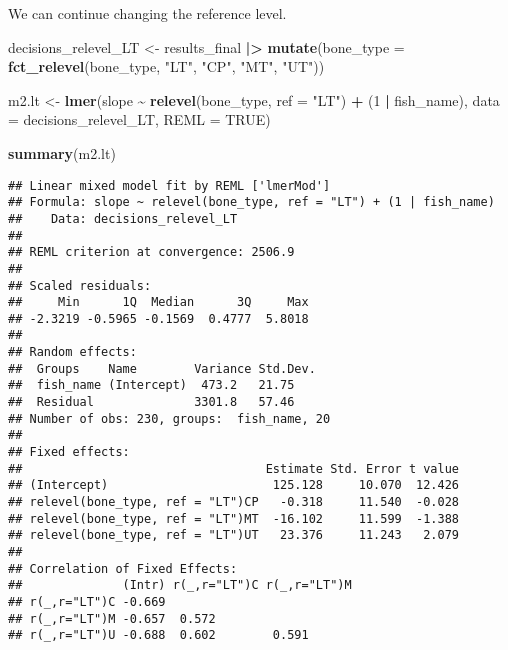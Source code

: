 \documentclass[
]{article}
\newenvironment{Shaded}{\begin{snugshade}}{\end{snugshade}}
\newcommand{\AttributeTok}[1]{\textcolor[rgb]{0.13,0.29,0.53}{#1}}
\newcommand{\ConstantTok}[1]{\textcolor[rgb]{0.56,0.35,0.01}{#1}}
\newcommand{\DecValTok}[1]{\textcolor[rgb]{0.00,0.00,0.81}{#1}}
\newcommand{\FunctionTok}[1]{\textcolor[rgb]{0.13,0.29,0.53}{\textbf{#1}}}
\newcommand{\NormalTok}[1]{#1}
\newcommand{\OtherTok}[1]{\textcolor[rgb]{0.56,0.35,0.01}{#1}}
\newcommand{\SpecialCharTok}[1]{\textcolor[rgb]{0.81,0.36,0.00}{\textbf{#1}}}
\newcommand{\StringTok}[1]{\textcolor[rgb]{0.31,0.60,0.02}{#1}}
\begin{document}
We can continue changing the reference level.

\begin{Shaded}
\begin{Highlighting}[]
\NormalTok{decisions\_relevel\_LT }\OtherTok{\textless{}{-}}\NormalTok{ results\_final }\SpecialCharTok{|\textgreater{}}
   \FunctionTok{mutate}\NormalTok{(}\AttributeTok{bone\_type =} \FunctionTok{fct\_relevel}\NormalTok{(bone\_type, }\StringTok{"LT"}\NormalTok{, }\StringTok{"CP"}\NormalTok{, }\StringTok{"MT"}\NormalTok{, }\StringTok{"UT"}\NormalTok{))}

\NormalTok{m2.lt }\OtherTok{\textless{}{-}} \FunctionTok{lmer}\NormalTok{(slope }\SpecialCharTok{\textasciitilde{}}  \FunctionTok{relevel}\NormalTok{(bone\_type, }\AttributeTok{ref =} \StringTok{"LT"}\NormalTok{) }\SpecialCharTok{+}\NormalTok{ (}\DecValTok{1} \SpecialCharTok{|}\NormalTok{ fish\_name), }\AttributeTok{data =}\NormalTok{ decisions\_relevel\_LT, }\AttributeTok{REML =} \ConstantTok{TRUE}\NormalTok{)}

\FunctionTok{summary}\NormalTok{(m2.lt)}
\end{Highlighting}
\end{Shaded}

\begin{verbatim}
## Linear mixed model fit by REML ['lmerMod']
## Formula: slope ~ relevel(bone_type, ref = "LT") + (1 | fish_name)
##    Data: decisions_relevel_LT
## 
## REML criterion at convergence: 2506.9
## 
## Scaled residuals: 
##     Min      1Q  Median      3Q     Max 
## -2.3219 -0.5965 -0.1569  0.4777  5.8018 
## 
## Random effects:
##  Groups    Name        Variance Std.Dev.
##  fish_name (Intercept)  473.2   21.75   
##  Residual              3301.8   57.46   
## Number of obs: 230, groups:  fish_name, 20
## 
## Fixed effects:
##                                  Estimate Std. Error t value
## (Intercept)                       125.128     10.070  12.426
## relevel(bone_type, ref = "LT")CP   -0.318     11.540  -0.028
## relevel(bone_type, ref = "LT")MT  -16.102     11.599  -1.388
## relevel(bone_type, ref = "LT")UT   23.376     11.243   2.079
## 
## Correlation of Fixed Effects:
##              (Intr) r(_,r="LT")C r(_,r="LT")M
## r(_,r="LT")C -0.669                          
## r(_,r="LT")M -0.657  0.572                   
## r(_,r="LT")U -0.688  0.602        0.591
\end{verbatim}
\end{document}
